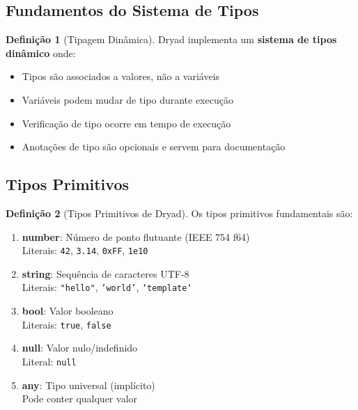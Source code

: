 \documentclass[12pt,a4paper]{article}
\theoremstyle{definition}
\newtheorem{definition}{Definição}[section]
\begin{document}
\subsection{Fundamentos do Sistema de Tipos}

\begin{definition}[Tipagem Dinâmica]
Dryad implementa um \textbf{sistema de tipos dinâmico} onde:
\begin{itemize}
    \item Tipos são associados a valores, não a variáveis
    \item Variáveis podem mudar de tipo durante execução
    \item Verificação de tipo ocorre em tempo de execução
    \item Anotações de tipo são opcionais e servem para documentação
\end{itemize}
\end{definition}

\subsection{Tipos Primitivos}

\begin{definition}[Tipos Primitivos de Dryad]
Os tipos primitivos fundamentais são:

\begin{enumerate}
    \item \textbf{number}: Número de ponto flutuante (IEEE 754 f64) \\
    Literais: \texttt{42}, \texttt{3.14}, \texttt{0xFF}, \texttt{1e10}
    
    \item \textbf{string}: Sequência de caracteres UTF-8 \\
    Literais: \texttt{"hello"}, \texttt{'world'}, \texttt{`template`}
    
    \item \textbf{bool}: Valor booleano \\
    Literais: \texttt{true}, \texttt{false}
    
    \item \textbf{null}: Valor nulo/indefinido \\
    Literal: \texttt{null}
    
    \item \textbf{any}: Tipo universal (implícito) \\
    Pode conter qualquer valor
\end{enumerate}
\end{definition}
\end{document}
